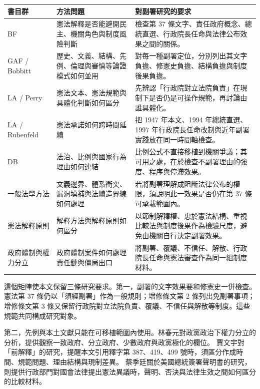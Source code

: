 \documentclass[12pt]{ctexart}
\begin{document}
\begin{longtable}{p{3.1cm}p{4.2cm}p{6.7cm}}
\toprule
書目群 & 方法問題 & 對副署研究的要求 \\
\midrule
BF & 憲法解釋是否能避開民主、機關角色與制度風險判斷 & 檢查第 37 條文字、責任政府概念、總統直選、行政院長任命與法律公布效果之間的關係。\autocite[26--30]{barber_fleming_2007}\\
GAF / Bobbitt & 歷史、文義、結構、先例、倫理與審慎等論證模式如何並用 & 對每一種副署定位，分別列出其文字負擔、修憲史負擔、結構負擔與制度後果負擔。\autocite[4]{bobbitt_gaf_5ed}\\
LA / Perry & 憲法文本、憲法規範與具體化判斷如何區分 & 先辨認「行政院對立法院負責」在現制下是否仍是可操作規範，再討論由誰具體化。\autocite[99--151]{perry_1998}\\
LA / Rubenfeld & 憲法承諾如何跨時間延續 & 把 1947 年本文、1994 年總統直選、1997 年行政院長任命改制與近年副署實踐放在同一時間軸檢查。\autocite[194--235]{rubenfeld_1998}\\
DB & 法治、比例與國家行為理由如何連結 & 比例公式不直接移植到機關爭議；其可用之處，在於檢查不副署理由的強度、程序與停滯效果。\autocite[159--188]{beatty_2004}\\
一般法學方法 & 文義邊界、體系衝突、漏洞填補與法續造界線如何處理 & 若將副署理解成阻斷法律公布的權限，須說明此一效果是否仍在第 37 條可承載範圍內。\autocites{yang_jurisprudence_2017}{lee_methodology_2018}{larenz_methodology_2008}\\
憲法解釋原則 & 解釋方法與解釋原則如何區分 & 以節制解釋權、忠於憲法結構、重視比較法與制度後果作為檢驗尺度，避免由機關自行決定副署效果。\autocite[559--627]{chen_constitutional_interpretation_2019}\\
政府體制與權力分立 & 政府體制案件如何處理責任鏈與僵局出口 & 將副署、覆議、不信任、解散、行政院長任命與憲法審查作為同一組制度材料。\autocites{tang_constitutional_structure_2014}{tang_judicial_review_balance_2014}{tang_tiered_proportionality_2009}\\
\bottomrule
\end{longtable}

這個矩陣使本文保留三條研究要求。第一，副署的文字效果要和修憲史一併檢查。憲法第 37 條仍以「須經副署」作為一般規則；增修條文第 2 條列出免副署事項；增修條文第 3 條又保留行政院對立法院負責、覆議、不信任與解散等制度。這些規範共同構成研究對象。

第二，先例與本土文獻只能在可移植範圍內使用。林春元對政黨政治下權力分立的分析，提供觀察一致政府、分立政府、少數政府與政黨極化的欄位。\autocite[325--370]{lin_chunyuan_2013} 賈文宇對「前解釋」的研究，提醒本文引用釋字第 387、419、499 號時，須區分作成時間、規範問題、理由結構與現制差異。\autocite[613--641]{jia_wenyu_2021} 蔡季廷關於美國總統簽署聲明書的研究，則提供行政部門對國會法律提出憲法異議時，聲明、否決與法律生效之間如何區分的比較材料。\autocite[85--146]{tsai_jiting_2013}
\end{document}
